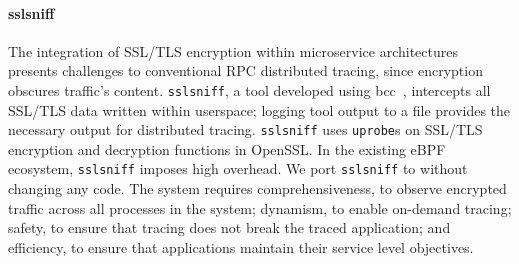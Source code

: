 





\paragraph{sslsniff}

The integration of SSL/TLS encryption within microservice architectures presents challenges to conventional RPC distributed tracing, since encryption obscures traffic's content.  \texttt{sslsniff}, a tool developed using bcc~\cite{bcc}, intercepts all SSL/TLS data written within userspace; logging tool output to a file provides the necessary output for distributed tracing.  \texttt{sslsniff} uses \texttt{uprobe}s on SSL/TLS encryption and decryption functions in OpenSSL.  In the existing eBPF ecosystem, \texttt{sslsniff} imposes high overhead. We port \texttt{sslsniff} to \sys{} without changing any code.  The system requires comprehensiveness, to observe encrypted traffic across all processes in the system; dynamism, to enable on-demand tracing; safety, to ensure that tracing does not break the traced application; and efficiency, to ensure that applications maintain their service level objectives.


